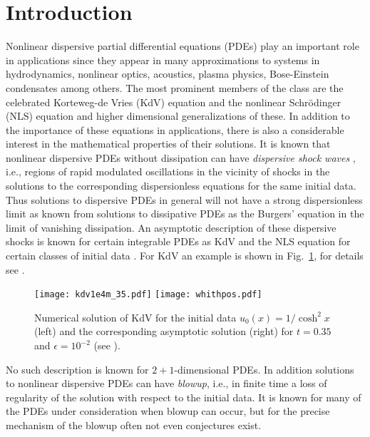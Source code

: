 \documentclass[final]{siamltex}
\begin{document}
\section{Introduction}
Nonlinear dispersive partial differential equations (PDEs) play an important 
role in applications since they appear in many approximations to 
systems in hydrodynamics, nonlinear optics, acoustics, plasma 
physics, Bose-Einstein condensates among others. The most prominent members of the class are the 
celebrated Korteweg-de Vries (KdV) equation and the nonlinear 
Schr\"odinger (NLS) equation and higher dimensional generalizations 
of these. In addition to the importance of these equations in 
applications, there is also a considerable interest in the 
mathematical properties of their solutions. It is known that 
nonlinear dispersive PDEs without dissipation can have 
\emph{dispersive shock waves} \cite{GP}, i.e., regions of rapid modulated 
oscillations in the vicinity of shocks in the solutions to the corresponding 
dispersionless equations for the same initial data. Thus solutions to 
dispersive PDEs in general will not 
have a strong dispersionless limit as known from solutions to 
dissipative PDEs as 
the Burgers' equation in the limit of vanishing dissipation. An 
asymptotic description of these dispersive shocks is known for 
certain integrable PDEs as KdV \cite{LL,Ven,DVZ} and the NLS equation 
for certain classes of initial data 
\cite{JLM,KMM,TVZ}. For KdV an example is shown in 
Fig.~\ref{figposdata}, for details see \cite{GK}.
\begin{figure}[!htb]
\centering
\texttt{[image: kdv1e4m\_35.pdf]}\quad
\texttt{[image: whithpos.pdf]}\newline
\caption{Numerical solution of KdV  for the initial data
 $u_0(x)=1/\cosh^2x$ (left) and the corresponding
 asymptotic solution (right) for  $t=0.35$ and  
 $\epsilon=10^{-2}$ (see \cite{GK}).}
\label{figposdata}
\end{figure}

No such description is known for $2+1$-dimensional 
PDEs. In addition solutions to nonlinear dispersive PDEs can have 
\emph{blowup}, i.e., in finite time a loss of regularity of the solution with 
respect to the initial data. It is known for many of the 
PDEs under consideration when blowup can occur, but for the precise mechanism of the 
blowup often not even conjectures exist.
\end{document}
